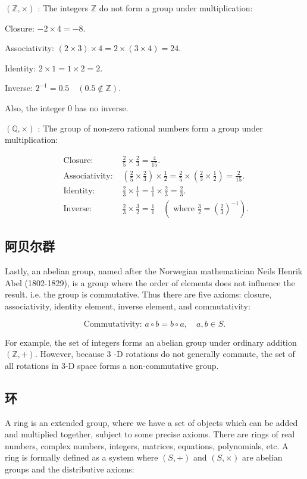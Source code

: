 $(\mathbb{Z}, \times)$ : The integers $\mathbb{Z}$ do not form a group under multiplication:

Closure: $-2 \times 4=-8$.

Associativity: $(2 \times 3) \times 4=2 \times(3 \times 4)=24$.

Identity: $2 \times 1=1 \times 2=2$.

Inverse: $2^{-1}=0.5 \quad(0.5 \notin \mathbb{Z})$.

Also, the integer 0 has no inverse.

$(\mathbb{Q}, \times)$ : The group of non-zero rational numbers form a group under multiplication:

$$
\begin{aligned}
\text { Closure: } & \frac{2}{5} \times \frac{2}{3}=\frac{4}{15} . \\
\text { Associativity: } & \left(\frac{2}{5} \times \frac{2}{3}\right) \times \frac{1}{2}=\frac{2}{5} \times\left(\frac{2}{3} \times \frac{1}{2}\right)=\frac{2}{15} . \\
\text { Identity: } & \frac{2}{3} \times \frac{1}{1}=\frac{1}{1} \times \frac{2}{3}=\frac{2}{3} . \\
\text { Inverse: } & \frac{2}{3} \times \frac{3}{2}=\frac{1}{1} \quad\left(\text { where } \frac{3}{2}=\left(\frac{2}{3}\right)^{-1}\right) .
\end{aligned}
$$

\subsection{阿贝尔群}
Lastly, an abelian group, named after the Norwegian mathematician Neils Henrik Abel (1802-1829), is a group where the order of elements does not influence the result. i.e. the group is commutative. Thus there are five axioms: closure, associativity, identity element, inverse element, and commutativity:

$$
\text { Commutativity: } a \circ b=b \circ a, \quad a, b \in S \text {. }
$$

For example, the set of integers forms an abelian group under ordinary addition $(\mathbb{Z},+)$. However, because 3 -D rotations do not generally commute, the set of all rotations in 3-D space forms a non-commutative group.

\subsection{环}
A ring is an extended group, where we have a set of objects which can be added and multiplied together, subject to some precise axioms. There are rings of real numbers, complex numbers, integers, matrices, equations, polynomials, etc. A ring is formally defined as a system where $(S,+)$ and $(S, \times)$ are abelian groups and the distributive axioms:

